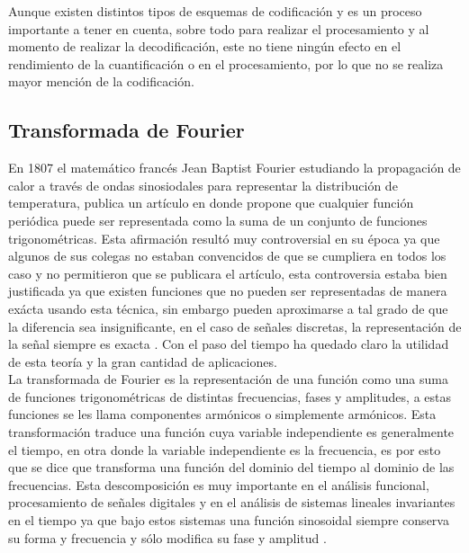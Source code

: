 Aunque existen distintos tipos de esquemas de codificaci\'on y es un proceso importante a tener en cuenta, sobre todo para realizar el procesamiento y al momento de realizar la decodificaci\'on, este no tiene ning\'un efecto en el rendimiento de la cuantificaci\'on o en el procesamiento, por lo que no se realiza mayor menci\'on de la codificaci\'on.\\



\subsection{Transformada de Fourier}

En 1807 el matem\'atico franc\'es Jean Baptist Fourier estudiando la propagaci\'on de calor a trav\'es de ondas sinosiodales para representar la distribuci\'on de temperatura, publica un art\'iculo en donde propone que cualquier funci\'on peri\'odica puede ser representada como la suma de un conjunto de funciones trigonom\'etricas. Esta afirmaci\'on result\'o muy controversial en su \'epoca ya que algunos de sus colegas no estaban convencidos de que se cumpliera en todos los caso y no permitieron que se publicara el art\'iculo, esta controversia estaba bien justificada ya que existen funciones que no pueden ser representadas de manera ex\'acta usando esta t\'ecnica, sin embargo pueden aproximarse a tal grado de que la diferencia sea insignificante, en el caso de señales discretas, la representaci\'on de la señal siempre es exacta \cite{smith}. Con el paso del tiempo ha quedado claro la utilidad de esta teor\'ia y la gran cantidad de aplicaciones.\\

La transformada de Fourier es la representaci\'on de una funci\'on como una suma de funciones trigonom\'etricas de distintas frecuencias, fases y amplitudes, a estas funciones se les llama componentes arm\'onicos o simplemente arm\'onicos. Esta transformaci\'on traduce una funci\'on cuya variable independiente es generalmente el tiempo, en otra donde la variable independiente es la frecuencia, es por esto que se dice que transforma una funci\'on del dominio del tiempo al dominio de las frecuencias. Esta descomposici\'on es muy importante en el an\'alisis funcional, procesamiento de señales digitales y en el an\'alisis de sistemas lineales invariantes en el tiempo ya que bajo estos sistemas una funci\'on sinosoidal siempre conserva su forma y frecuencia y s\'olo modifica su fase y amplitud \cite{proakis}.\\ 

